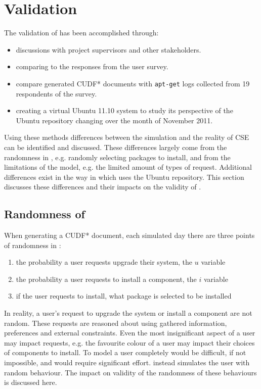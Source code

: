 \section{\usermodel Validation}
\label{sim.modelvalidation}
The validation of \usermodel has been accomplished through:
\begin{itemize}
  \item discussions with project supervisors and other stakeholders.
  \item comparing \usermodel to the responses from the user survey.
  \item compare generated CUDF* documents with \texttt{apt-get} logs collected from 19 respondents of the survey.
  \item creating a virtual Ubuntu 11.10 system to study its perspective of the Ubuntu repository changing over the month of November 2011.
\end{itemize}

Using these methods differences between the simulation and the reality of CSE can be identified and discussed.
These differences largely come from the randomness in \usermodel, e.g. randomly selecting packages to install,
and from the limitations of the model, e.g. the limited amount of types of request.
Additional differences exist in the way in which \usermodel uses the Ubuntu repository.
This section discusses these differences and their impacts on the validity of \usermodel.

\subsection{Randomness of \usermodel}
\label{sim.randomness}
When generating a CUDF* document, each simulated day there are three points of randomness in \usermodel:
\begin{enumerate}
  \item the probability a user requests upgrade their system, the $u$ variable
  \item the probability a user requests to install a component, the $i$ variable
  \item if the user requests to install, what package is selected to be installed
\end{enumerate}
In reality, a user's request to upgrade the system or install a component are not random.
These requests are reasoned about using gathered information, preferences and external constraints.
Even the most insignificant aspect of a user may impact requests, e.g. the favourite colour of a user may impact their choices of components to install.
To model a user completely would be difficult, if not impossible, and would require significant effort.
\usermodel instead simulates the user with random behaviour.
The impact on validity of the randomness of these behaviours is discussed here.

